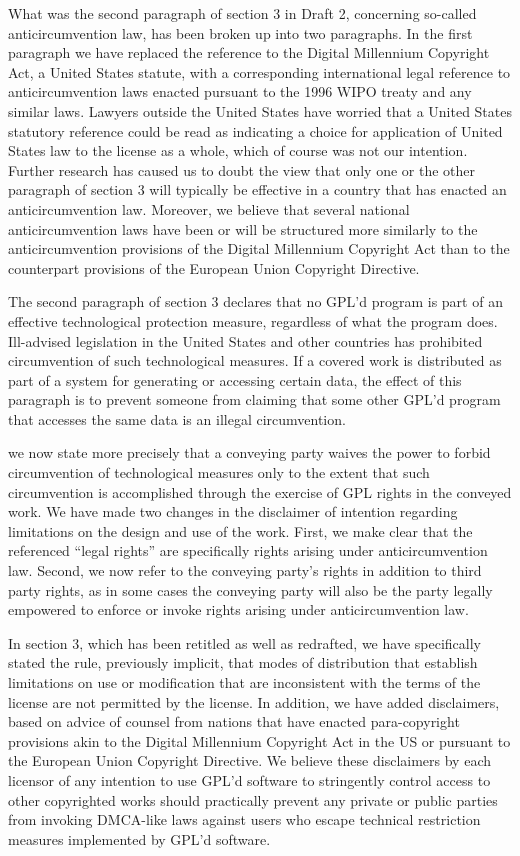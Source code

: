 What was the second paragraph of section 3 in Draft 2, concerning so-called
anticircumvention law, has been broken up into two paragraphs.  In the first
paragraph we have replaced the reference to the Digital Millennium Copyright
Act, a United States statute, with a corresponding international legal
reference to anticircumvention laws enacted pursuant to the 1996 WIPO treaty
and any similar laws.  Lawyers outside the United States have worried that a
United States statutory reference could be read as indicating a choice for
application of United States law to the license as a whole, which of course
was not our intention.  Further research has caused us to doubt the view that
only one or the other paragraph of section 3 will typically be effective in a
country that has enacted an anticircumvention law.  Moreover, we believe that
several national anticircumvention laws have been or will be structured more
similarly to the anticircumvention provisions of the Digital Millennium
Copyright Act than to the counterpart provisions of the European Union
Copyright Directive.

The second paragraph of section 3 declares that no GPL'd program is part of
an effective technological protection measure, regardless of what the program
does. Ill-advised legislation in the United States and other countries has
prohibited circumvention of such technological measures. If a covered work is
distributed as part of a system for generating or accessing certain data, the
effect of this paragraph is to prevent someone from claiming that some other
GPL'd program that accesses the same data is an illegal circumvention.

we now state more precisely that a conveying party waives the power to forbid
circumvention of technological measures only to the extent that such
circumvention is accomplished through the exercise of GPL rights in the
conveyed work. We have made two changes in the disclaimer of intention
regarding limitations on the design and use of the work. First, we make clear
that the referenced ``legal rights'' are specifically rights arising under
anticircumvention law.  Second, we now refer to the conveying party's rights
in addition to third party rights, as in some cases the conveying party will
also be the party legally empowered to enforce or invoke rights arising under
anticircumvention law.


In section 3, which has been retitled as well as redrafted, we have
specifically stated the rule, previously implicit, that modes of
distribution that establish limitations on use or modification that
are inconsistent with the terms of the license are not permitted by
the license.  In addition, we have added disclaimers, based on advice
of counsel from nations that have enacted para-copyright provisions
akin to the Digital Millennium Copyright Act in the US or pursuant to
the European Union Copyright Directive.  We believe these disclaimers
by each licensor of any intention to use GPL'd software to stringently
control access to other copyrighted works should practically prevent
any private or public parties from invoking DMCA-like laws against
users who escape technical restriction measures implemented by GPL'd
software.

